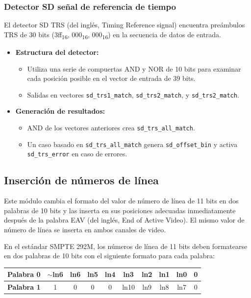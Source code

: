 \subsubsection{Detector SD señal de referencia de tiempo}

El detector SD TRS (del inglés, Timing Reference signal) encuentra preámbulos TRS de 30 bits (3ff\textsubscript{16},
000\textsubscript{16}, 000\textsubscript{16}) en
la secuencia de datos de entrada.

\begin{itemize}
    \item \textbf{Estructura del detector:}
    \begin{itemize}
        \item Utiliza una serie de compuertas AND y NOR de 10 bits para examinar cada posición posible en el vector de entrada de 39 bits.
        \item Salidas en vectores \texttt{sd\_trs1\_match}, \texttt{sd\_trs2\_match}, y \texttt{sd\_trs2\_match}.
    \end{itemize}
    
    \item \textbf{Generación de resultados:}
    \begin{itemize}
        \item AND de los vectores anteriores crea \texttt{sd\_trs\_all\_match}.
        \item Un caso basado en \texttt{sd\_trs\_all\_match} genera \texttt{sd\_offset\_bin} y activa \texttt{sd\_trs\_error} en caso de errores.
    \end{itemize}
\end{itemize}

\subsection{Inserción de números de línea}

Este módulo cambia el formato del valor de número de línea de 11 bits en dos
palabras de 10 bits y las inserta en sus posiciones adecuadas inmediatamente
después de la palabra EAV (del inglés, End of Active Video)\@. El mismo valor
de número de línea se inserta en ambos canales de video.

En el estándar SMPTE 292M, los números de línea de 11 bits deben formatearse en
dos palabras de 10 bits con el siguiente formato para cada palabra:

\begin{center}
  \begin{tabular}{|c|c|c|c|c|c|c|c|c|c|}
    \hline
    \textbf{Palabra 0} & $\sim$ln6 & ln6 & ln5 & ln4 & ln3 & ln2 & ln1 & ln0 & 0 \\
    \hline
    \textbf{Palabra 1} & 1 & 0 & 0 & 0 & ln10 & ln9 & ln8 & ln7 & 0 \\
    \hline
  \end{tabular}
\end{center}

